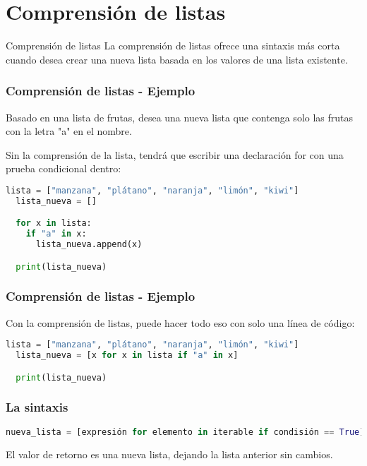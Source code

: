 \section{Comprensión de listas}

\begin{frame}[c]{Comprensión de listas}
  La comprensión de listas ofrece una sintaxis más corta cuando
  desea crear una nueva lista basada en los valores de una lista
  existente.
\end{frame}

\begin{frame}[fragile]
  \frametitle{Comprensión de listas - Ejemplo}

  Basado en una lista de frutas, desea una nueva lista que
  contenga solo las frutas con la letra "a" en el nombre.

  \vspace{\baselineskip}
  Sin la comprensión de la lista, tendrá que escribir una declaración
  \textcolor{codeKeyword}{for} con una prueba condicional dentro: 

  \vspace{\baselineskip}
  \begin{lstlisting}[language=Python]
  lista = ["manzana", "plátano", "naranja", "limón", "kiwi"]
  lista_nueva = []

  for x in lista:
    if "a" in x:
      lista_nueva.append(x)

  print(lista_nueva)
  \end{lstlisting}
\end{frame}

\begin{frame}[fragile]
  \frametitle{Comprensión de listas - Ejemplo}

  Con la comprensión de listas, puede hacer todo eso con
  solo una línea de código:

  \vspace{\baselineskip}
  \begin{lstlisting}[language=Python]
  lista = ["manzana", "plátano", "naranja", "limón", "kiwi"]
  lista_nueva = [x for x in lista if "a" in x]

  print(lista_nueva)
  \end{lstlisting}
\end{frame}

\begin{frame}[fragile]
  \frametitle{La sintaxis}

  \begin{lstlisting}[language=Python]
nueva_lista = [expresión for elemento in iterable if condisión == True]
  \end{lstlisting}

  El valor de retorno es una nueva lista, dejando la lista anterior sin cambios.
\end{frame}

